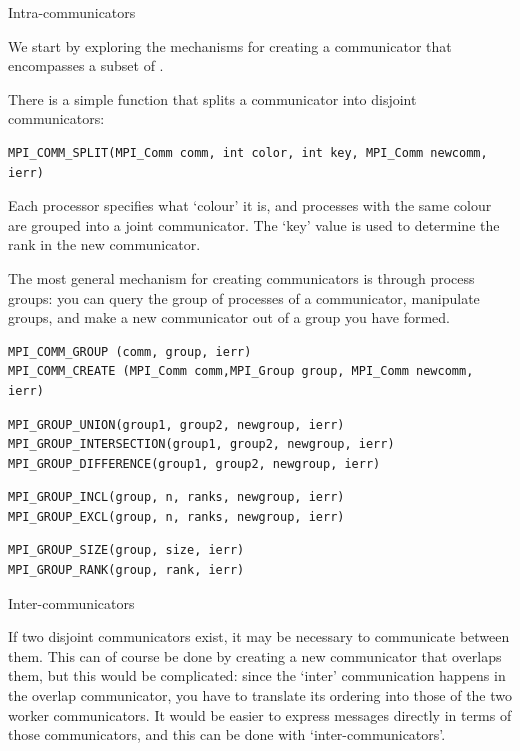  {Intra-communicators}
\label{sec:comm-group}

We start by exploring the mechanisms for creating a communicator that
encompasses a subset of . 

There is a simple function that splits a communicator into disjoint
communicators:
\begin{verbatim}
MPI_COMM_SPLIT(MPI_Comm comm, int color, int key, MPI_Comm newcomm, ierr)
\end{verbatim}
Each processor specifies what `colour' it is, and processes with the
same colour are grouped into a joint communicator. The `key' value is
used to determine the rank in the new communicator.

The most general mechanism for creating communicators is through
process groups: you can query the group of processes of a
communicator, manipulate groups, and make a new communicator out of a
group you have formed.

\begin{verbatim}
MPI_COMM_GROUP (comm, group, ierr)
MPI_COMM_CREATE (MPI_Comm comm,MPI_Group group, MPI_Comm newcomm, ierr)
\end{verbatim}

\begin{verbatim}
MPI_GROUP_UNION(group1, group2, newgroup, ierr)
MPI_GROUP_INTERSECTION(group1, group2, newgroup, ierr)
MPI_GROUP_DIFFERENCE(group1, group2, newgroup, ierr)
\end{verbatim}

\begin{verbatim}
MPI_GROUP_INCL(group, n, ranks, newgroup, ierr)
MPI_GROUP_EXCL(group, n, ranks, newgroup, ierr)
\end{verbatim}
\begin{verbatim}
MPI_GROUP_SIZE(group, size, ierr)
MPI_GROUP_RANK(group, rank, ierr)
\end{verbatim}

 {Inter-communicators}

If two disjoint communicators exist, it may be necessary to
communicate between them. This can of course be done by creating a new
communicator that overlaps them, but this would be complicated: since
the `inter' communication happens in the overlap communicator, you
have to translate its ordering into those of the two worker
communicators. It would be easier to express messages directly in
terms of those communicators, and this can be done with
`inter-communicators'.

